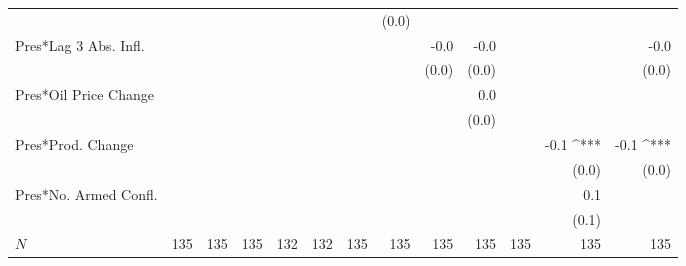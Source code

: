 \documentclass[a4paper]{article}\usepackage[]{graphicx}\usepackage[]{color}
\begin{document}
\begin{table}[ht]
\begin{center}
{{\begin{tabular}{ l D{.}{.}{1}D{.}{.}{1}D{.}{.}{1}D{.}{.}{1}D{.}{.}{1}D{.}{.}{1}D{.}{.}{1}D{.}{.}{1}D{.}{.}{1}D{.}{.}{1}D{.}{.}{1}D{.}{.}{1} }
                      &                 &                 &                 &                 &                 &                 & (0.0)           &                 &                 &                 &                 &                \\ 
Pres*Lag 3 Abs. Infl. &                 &                 &                 &                 &                 &                 &                 & -0.0            & -0.0            &                 &                 & -0.0           \\ 
                      &                 &                 &                 &                 &                 &                 &                 & (0.0)           & (0.0)           &                 &                 & (0.0)          \\ 
Pres*Oil Price Change &                 &                 &                 &                 &                 &                 &                 &                 & 0.0             &                 &                 &                \\ 
                      &                 &                 &                 &                 &                 &                 &                 &                 & (0.0)           &                 &                 &                \\ 
Pres*Prod. Change     &                 &                 &                 &                 &                 &                 &                 &                 &                 &                 & -0.1 ^{***}     & -0.1 ^{***}    \\ 
                      &                 &                 &                 &                 &                 &                 &                 &                 &                 &                 & (0.0)           & (0.0)          \\ 
Pres*No. Armed Confl. &                 &                 &                 &                 &                 &                 &                 &                 &                 &                 & 0.1             &                \\ 
                      &                 &                 &                 &                 &                 &                 &                 &                 &                 &                 & (0.1)           &                 \\
 $N$                   & 135             & 135             & 135             & 132             & 132             & 135             & 135             & 135             & 135             & 135             & 135             & 135            \\ 

\end{tabular}}}
\end{center}
\end{table}
\end{document}

